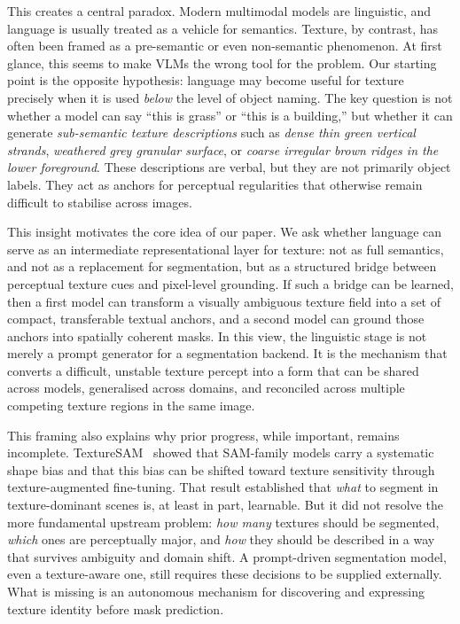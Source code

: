 \documentclass{article}
\begin{document}
This creates a central paradox. Modern multimodal models are linguistic, and language is usually treated as a vehicle for semantics. Texture, by contrast, has often been framed as a pre-semantic or even non-semantic phenomenon. At first glance, this seems to make VLMs the wrong tool for the problem. Our starting point is the opposite hypothesis: language may become useful for texture precisely when it is used \emph{below} the level of object naming. The key question is not whether a model can say ``this is grass'' or ``this is a building,'' but whether it can generate \emph{sub-semantic texture descriptions} such as \emph{dense thin green vertical strands}, \emph{weathered grey granular surface}, or \emph{coarse irregular brown ridges in the lower foreground}. These descriptions are verbal, but they are not primarily object labels. They act as anchors for perceptual regularities that otherwise remain difficult to stabilise across images.

This insight motivates the core idea of our paper. We ask whether language can serve as an intermediate representational layer for texture: not as full semantics, and not as a replacement for segmentation, but as a structured bridge between perceptual texture cues and pixel-level grounding. If such a bridge can be learned, then a first model can transform a visually ambiguous texture field into a set of compact, transferable textual anchors, and a second model can ground those anchors into spatially coherent masks. In this view, the linguistic stage is not merely a prompt generator for a segmentation backend. It is the mechanism that converts a difficult, unstable texture percept into a form that can be shared across models, generalised across domains, and reconciled across multiple competing texture regions in the same image.

This framing also explains why prior progress, while important, remains incomplete. TextureSAM~\cite{texturesam} showed that SAM-family models carry a systematic shape bias and that this bias can be shifted toward texture sensitivity through texture-augmented fine-tuning. That result established that \emph{what} to segment in texture-dominant scenes is, at least in part, learnable. But it did not resolve the more fundamental upstream problem: \emph{how many} textures should be segmented, \emph{which} ones are perceptually major, and \emph{how} they should be described in a way that survives ambiguity and domain shift. A prompt-driven segmentation model, even a texture-aware one, still requires these decisions to be supplied externally. What is missing is an autonomous mechanism for discovering and expressing texture identity before mask prediction.
\end{document}
